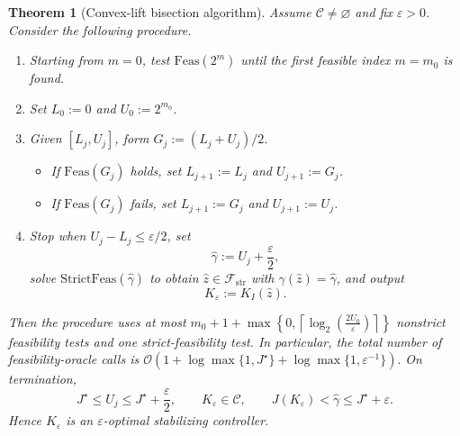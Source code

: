 \documentclass[10pt,a4paper]{amsart}
\newtheorem{theorem}{Theorem}
\providecommand{\cC}{\mathcal{C}}
\providecommand{\cF}{\mathcal{F}}
\begin{document}
\begin{theorem}[Convex-lift bisection algorithm]\label{thm:bisection}
Assume $\cC\neq\varnothing$ and fix $\varepsilon>0$. Consider the following procedure.
\begin{enumerate}
    \item Starting from $m=0$, test $\mathrm{Feas}(2^m)$ until the first feasible index $m=m_0$ is found.
    \item Set $L_0:=0$ and $U_0:=2^{m_0}$.
    \item Given $[L_j,U_j]$, form $G_j:=(L_j+U_j)/2$.
    \begin{itemize}[leftmargin=1em]
        \item If $\mathrm{Feas}(G_j)$ holds, set $L_{j+1}:=L_j$ and $U_{j+1}:=G_j$.
        \item If $\mathrm{Feas}(G_j)$ fails, set $L_{j+1}:=G_j$ and $U_{j+1}:=U_j$.
    \end{itemize}
    \item Stop when $U_j-L_j\le\varepsilon/2$, set
    \[
    \widehat\gamma:=U_j+\frac{\varepsilon}{2},
    \]
    solve $\mathrm{StrictFeas}(\widehat\gamma)$ to obtain $\widehat z\in\cF_{\mathrm{str}}$ with $\gamma(\widehat z)=\widehat\gamma$, and output
    \[
    K_\varepsilon:=K_I(\widehat z).
    \]
\end{enumerate}
Then the procedure uses at most
$
m_0+1+
\max\left\{
0,
\left\lceil
\log_2\!\left(\frac{2U_0}{\varepsilon}\right)
\right\rceil
\right\}
$
nonstrict feasibility tests and one strict-feasibility test. In
particular, the total number of feasibility-oracle calls is
$
\mathcal{O}\!\left(
1+\log\max\{1,J^\star\}
+\log\max\{1,\varepsilon^{-1}\}
\right).
$
On termination,
\[
J^\star\le U_j\le J^\star+\frac{\varepsilon}{2},
\qquad
K_\varepsilon\in\cC,
\qquad
J(K_\varepsilon)<\widehat\gamma\le J^\star+\varepsilon.
\]
Hence $K_\varepsilon$ is an $\varepsilon$-optimal stabilizing controller.
\end{theorem}
\end{document}
